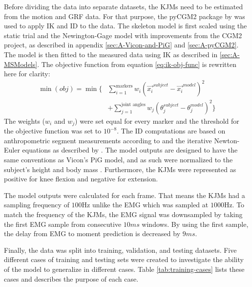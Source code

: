 \documentclass[../main.tex]{subfiles}
\begin{document}
Before dividing the data into separate datasets, the \acp{KJM} need to be estimated from the motion and \ac{GRF} data.
For that purpose, the pyCGM2 package by \textcite{Leboeuf2019} was used to apply \ac{IK} and \ac{ID} to the data.
The skeleton model is first scaled using the static trial and the Newington-Gage model with improvements from the CGM2 project, as described in appendix \ref{sec:A-Vicon-and-PiG} and \ref{sec:A-pyCGM2}.
The model is then fitted to the measured data using \ac{IK} as described in \ref{sec:A-MSModels}. 
The objective function from equation \ref{eq:ik-obj-func} is rewritten here for clarity:
\begin{align*}
    \min(obj) = \min\biggl\{ &\sum_{i=1}^{\text{markers}}w_i \left(\Vec{x_i}^{subject}-\Vec{x_i}^{model}\right)^2 \nonumber\\ 
    &+ \sum_{j=1}^{\text{joint angles}}w_j \left( \theta_j^{subject}-\theta_j^{model}\right)^2 \biggr\}
\end{align*}
The weights ($w_i$ and $w_j$) were set equal for every marker and the threshold for the objective function was set to $10^{-8}$.
The \ac{ID} computations are based on anthropometric segment measurements according to \textcite{Dempster1955} and the iterative Newton-Euler equations as described by \textcite{Dumas2004}.
The model outputs are designed to have the same conventions as Vicon's \ac{PiG} model, and as such were normalized to the subject's height and body mass \cite{Leboeuf2019, viconpig}.
Furthermore, the \acp{KJM} were represented as positive for knee flexion and negative for extension.

The model outputs were calculated for each frame.
That means the \acp{KJM} had a sampling frequency of $100$Hz unlike the \ac{EMG} which was sampled at $1000$Hz.
To match the frequency of the \acp{KJM}, the \ac{EMG} signal was downsampled by taking the first \ac{EMG} sample from consecutive $10ms$ windows.
By using the first sample, the delay from \ac{EMG} to moment prediction is decreased by $9ms$. 

Finally, the data was split into training, validation, and testing datasets.
Five different cases of training and testing sets were created to investigate the ability of the model to generalize in different cases.
Table \ref{tab:training-cases} lists these cases and describes the purpose of each case.

\end{document}
